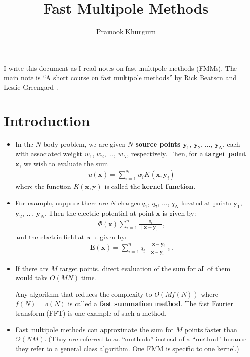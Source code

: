 \documentclass[10pt]{article}
\title{Fast Multipole Methods}
\author{Pramook Khungurn}
\newcommand{\ve}[1]{\mathbf{#1}}
\begin{document}
\maketitle	
	
I write this document as I read notes on fast multipole methods (FMMs). The main note is ``A short course on fast multipole methods'' by Rick Beatson and Leslie Greengard \cite{fmm}.
	
\section{Introduction}\label{sec:introduction} %

\begin{itemize}
  \item In the $N$-body problem, we are given $N$ \textbf{source points} $\ve{y}_1$, $\ve{y}_2$, $\dotsc$, $\ve{y}_N$, each with associated weight $w_1$, $w_2$, $\dotsc$, $w_N$, respectively. Then, for a \textbf{target point} $\ve{x}$, we wish to evaluate the sum
  \begin{align*}
    u(\ve{x}) = \sum_{i=1}^N w_i K(\ve{x}, \ve{y}_i)
  \end{align*}
  where the function $K(\ve{x},\ve{y})$ is called the \textbf{kernel function}.
  
  \item For example, suppose there are $N$ charges $q_1$, $q_2$, $\dotsc$, $q_N$ located at points $\ve{y}_1$, $\ve{y}_2$, $\dotsc$, $\ve{y}_N$. Then the electric potential at point $\ve{x}$ is given by:
  \begin{align*}
    \Phi(\ve{x}) \sum_{i=1}^n \frac{q_i}{\| \ve{x} - \ve{y}_i \|},
  \end{align*}
  and the electric field at $\ve{x}$ is given by:
  \begin{align*}
    \ve{E}(\ve{x}) = \sum_{i=1}^n q_i \frac{\ve{x} - \ve{y}_i}{\| \ve{x} - \ve{y}_i \|^3}.
  \end{align*}
  
  \item If there are $M$ target points, direct evaluation of the sum for all of them would take $O(MN)$ time. 
  
  Any algorithm that reduces the complexity to $O(M f(N))$ where $f(N) = o(N)$ is called a \textbf{fast summation method}. The fast Fourier transform (FFT) is one example of such a method.
  
  \item Fast multipole methods can approximate the sum for $M$ points faster than $O(NM)$. (They are referred to as ``methods'' instead of a ``method'' because they refer to a general class algorithm. One FMM is specific to one kernel.)
  
\end{itemize}
\end{document}
